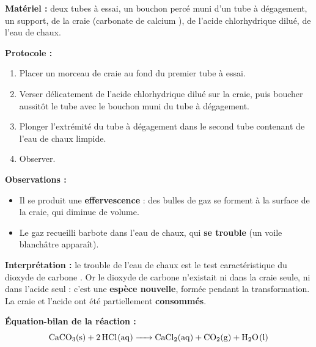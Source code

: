 \documentclass[11pt]{article}
\newcommand{\cle}[1]{{\popxbold\color{popdark}#1}}
\begin{document}
\begin{experience}
\textbf{Matériel :} deux tubes à essai, un bouchon percé muni d'un tube à dégagement, un support, de la craie (carbonate de calcium ), de l'acide chlorhydrique dilué, de l'eau de chaux.

\textbf{Protocole :}
\begin{enumerate}
\item Placer un morceau de craie au fond du premier tube à essai.
\item Verser délicatement de l'acide chlorhydrique dilué sur la craie, puis boucher aussitôt le tube avec le bouchon muni du tube à dégagement.
\item Plonger l'extrémité du tube à dégagement dans le second tube contenant de l'eau de chaux limpide.
\item Observer.
\end{enumerate}

\textbf{Observations :}
\begin{itemize}
\item Il se produit une \textbf{effervescence} : des bulles de gaz se forment à la surface de la craie, qui diminue de volume.
\item Le gaz recueilli barbote dans l'eau de chaux, qui \textbf{se trouble} (un voile blanchâtre apparaît).
\end{itemize}

\textbf{Interprétation :} le trouble de l'eau de chaux est le test caractéristique du \cle{dioxyde de carbone} . Or le dioxyde de carbone n'existait ni dans la craie seule, ni dans l'acide seul : c'est une \textbf{espèce nouvelle}, formée pendant la transformation. La craie et l'acide ont été partiellement \textbf{consommés}.

\textbf{Équation-bilan de la réaction :}
\[ \ce{CaCO3(s) + 2 HCl(aq) -> CaCl2(aq) + CO2(g) + H2O(l)} \]
\end{experience}
\end{document}
